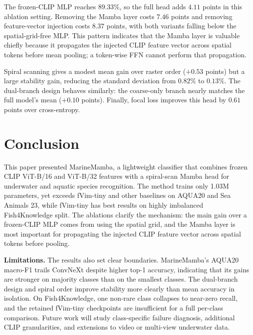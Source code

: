 \documentclass[runningheads]{llncs}
\begin{document}
The frozen-CLIP MLP reaches $89.33\%$, so the full head adds $4.11$ points in this ablation setting. Removing the Mamba layer costs $7.46$ points and removing feature-vector injection costs $8.37$ points, with both variants falling below the spatial-grid-free MLP. This pattern indicates that the Mamba layer is valuable chiefly because it propagates the injected CLIP feature vector across spatial tokens before mean pooling; a token-wise FFN cannot perform that propagation.

Spiral scanning gives a modest mean gain over raster order ($+0.53$ points) but a large stability gain, reducing the standard deviation from $0.82\%$ to $0.13\%$. The dual-branch design behaves similarly: the coarse-only branch nearly matches the full model's mean ($+0.10$ points). Finally, focal loss improves this head by $0.61$ points over cross-entropy.

\section{Conclusion}
\label{sec:conclusion}

This paper presented MarineMamba, a lightweight classifier that combines frozen CLIP ViT-B/16 and ViT-B/32 features with a spiral-scan Mamba head for underwater and aquatic species recognition. The method trains only 1.03M parameters, yet exceeds fVim-tiny and other baselines on AQUA20 and Sea Animals 23, while fVim-tiny has best results on highly imbalanced Fish4Knowledge split. The ablations clarify the mechanism: the main gain over a frozen-CLIP MLP comes from using the spatial grid, and the Mamba layer is most important for propagating the injected CLIP feature vector across spatial tokens before pooling.

\textbf{Limitations.} The results also set clear boundaries. MarineMamba's AQUA20 macro-F1 trails ConvNeXt despite higher top-1 accuracy, indicating that its gains are stronger on majority classes than on the smallest classes. The dual-branch design and spiral order improve stability more clearly than mean accuracy in isolation. On Fish4Knowledge, one non-rare class collapses to near-zero recall, and the retained fVim-tiny checkpoints are insufficient for a full per-class comparison. Future work will study class-specific failure diagnosis, additional CLIP granularities, and extensions to video or multi-view underwater data.



\end{document}
